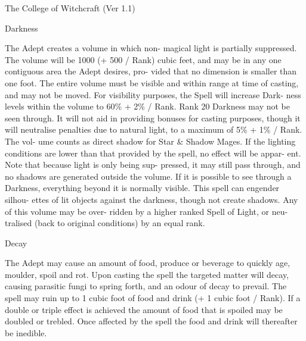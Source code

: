 \begin{Chapter}{The College of Witchcraft (Ver 1.1)}
\begin{spell}[G-2]{Darkness }
\begin{effects}
The Adept creates a volume in which non-
magical  light  is  partially  suppressed.  The  volume 
will be 1000 (+ 500 / Rank) cubic feet, and may be 
in any one contiguous area the Adept desires, pro-
vided  that  no  dimension  is  smaller  than  one  foot. 
The entire volume must be visible and within range 
at  time  of  casting,  and  may  not  be  moved.  For 
visibility  purposes,  the  Spell  will  increase  Dark-
ness levels within the volume to 60\% + 2\% / Rank. 
Rank 20 Darkness may not be seen through. It will 
not  aid  in  providing  bonuses  for  casting  purposes, 
though  it  will  neutralise  penalties  due  to  natural 
light, to a maximum of 5\% + 1\% / Rank. The vol-
ume  counts  as  direct  shadow  for  Star  \&  Shadow 
Mages.  If  the  lighting  conditions  are  lower  than 
that provided by the spell, no effect  will be appar-
ent.  Note  that  because  light  is  only  being  sup-
pressed, it may still pass through, and no shadows 
are generated outside the volume. If it is possible to 
see  through  a  Darkness,  everything  beyond  it  is 
normally  visible.  This  spell  can  engender  silhou-
ettes of lit objects against the darkness, though not 
create  shadows.  Any  of  this  volume  may  be  over-
ridden  by  a  higher  ranked  Spell  of  Light,  or  neu-
tralised  (back  to  original  conditions)  by  an  equal 
rank. 

\end{effects}
\end{spell}

\begin{spell}[G-3]{Decay }

\begin{effects}
 The  Adept  may  cause  an  amount  of  food, 
produce or beverage to quickly age, moulder, spoil 
and  rot.  Upon casting  the  spell  the  targeted  matter 
will  decay,  causing  parasitic  fungi  to  spring  forth, 
and  an  odour  of  decay  to  prevail.  The  spell  may 
ruin up to 1 cubic foot of food and drink (+ 1 cubic 
foot / Rank). If a double or triple effect is achieved 
the amount of food that is spoiled may be doubled 
or trebled. Once affected by the spell the food and 
drink will thereafter be inedible. 

\end{effects}
\end{spell}


\end{Chapter}
